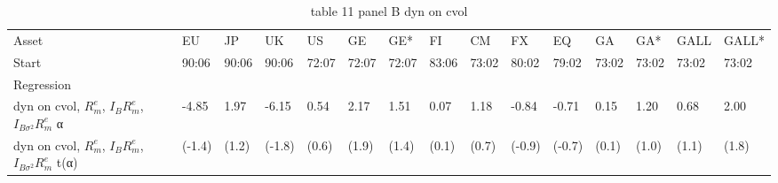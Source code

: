 \begin{table}[htbp]
  \centering
  \caption{table 11 panel B dyn on cvol}
  \label{tab:table_11_panel_B_dyn_on_cvol}
  \begin{tabular}{lllllllllllllll}
\toprule
Asset & EU & JP & UK & US & GE & GE* & FI & CM & FX & EQ & GA & GA* & GALL & GALL* \\
Start & 90:06 & 90:06 & 90:06 & 72:07 & 72:07 & 72:07 & 83:06 & 73:02 & 80:02 & 79:02 & 73:02 & 73:02 & 73:02 & 73:02 \\
Regression &  &  &  &  &  &  &  &  &  &  &  &  &  &  \\
\midrule
dyn on cvol, $R^e_m$, $I_B R^e_m$, $I_{B\sigma^2} R^e_m$ α & -4.85 & 1.97 & -6.15 & 0.54 & 2.17 & 1.51 & 0.07 & 1.18 & -0.84 & -0.71 & 0.15 & 1.20 & 0.68 & 2.00 \\
dyn on cvol, $R^e_m$, $I_B R^e_m$, $I_{B\sigma^2} R^e_m$ t(α) & (-1.4) & (1.2) & (-1.8) & (0.6) & (1.9) & (1.4) & (0.1) & (0.7) & (-0.9) & (-0.7) & (0.1) & (1.0) & (1.1) & (1.8) \\
\bottomrule
\end{tabular}

\end{table}
